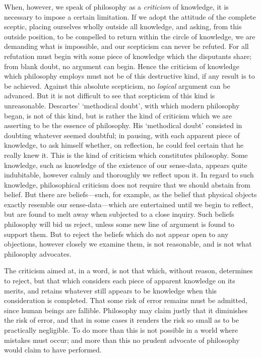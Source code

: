 \documentclass[oneside,letterpaper,12pt]{book}
\begin{document}
When, however, we speak of philosophy as a \emph{criticism} of
knowledge, it is necessary to impose a certain limitation. If we adopt
the attitude of the complete sceptic, placing ourselves wholly outside
all knowledge, and asking, from this outside position, to be compelled
to return within the circle of knowledge, we are demanding what is
impossible, and our scepticism can never be refuted. For all refutation
must begin with some piece of knowledge which the disputants share; from
blank doubt, no argument can begin. Hence the criticism of knowledge
which philosophy employs must not be of this destructive kind, if any
result is to be achieved. Against this absolute scepticism, no
\emph{logical} argument can be advanced. \label{skeptic} But it is not difficult to see
that scepticism of this kind is unreasonable.
Descartes' `methodical
doubt', with which modern philosophy began, is not of
this kind, but is rather the kind of criticism which we are asserting to
be the essence of philosophy. His `methodical
doubt' consisted in doubting whatever seemed doubtful;
in pausing, with each apparent piece of knowledge, to ask himself
whether, on reflection, he could feel certain that he really knew it.
This is the kind of criticism which constitutes philosophy. Some
knowledge, such as knowledge of the existence of our sense-data, appears
quite indubitable, however calmly and thoroughly we reflect upon it. In
regard to such knowledge, philosophical criticism does not require that
we should abstain from belief. But there are beliefs---such, for
example, as the belief that physical objects exactly resemble our
sense-data---which are entertained until we begin to reflect, but are
found to melt away when subjected to a close inquiry. Such beliefs
philosophy will bid us reject, unless some new line of argument is found
to support them. But to reject the beliefs which do not appear open to
any objections, however closely we examine them, is not reasonable, and
is not what philosophy advocates.

The criticism aimed at, in a word, is not that which, without reason,
determines to reject, but that which considers each piece of apparent
knowledge on its merits, and retains whatever still appears to be
knowledge when this consideration is completed. That some risk of error
remains must be admitted, since human beings are fallible. Philosophy
may claim justly that it diminishes the risk of error, and that in some
cases it renders the risk so small as to be practically negligible. To
do more than this is not possible in a world where mistakes must occur;
and more than this no prudent advocate of philosophy would claim to have
performed.
\end{document}
